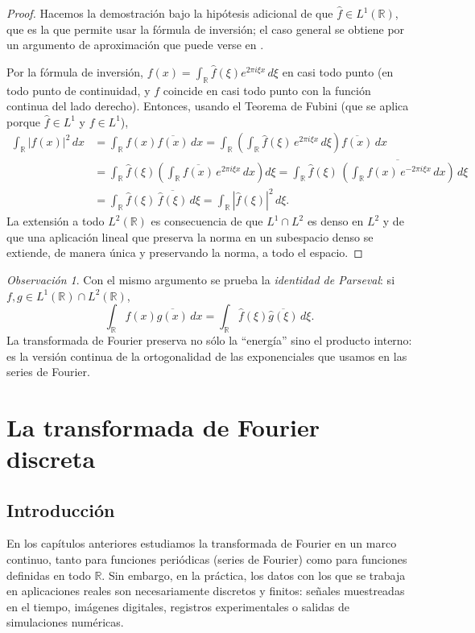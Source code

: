 \documentclass[12pt, a4paper]{amsbook}
\newcommand{\R}{{\mathbb R}}
\theoremstyle{remark}
\newtheorem{obs}[teo]{Observación}
\theoremstyle{definition}
\numberwithin{section}{chapter}
\numberwithin{subsection}{section}
\numberwithin{equation}{section}
\numberwithin{figure}{chapter}
\begin{document}
\begin{proof}
Hacemos la demostración bajo la hipótesis adicional de que $\hat f\in L^1(\R)$, que es la que permite usar la fórmula de inversión; el caso general se obtiene por un argumento de aproximación que puede verse en \cite{Duoandikoetxea}.

Por la fórmula de inversión, $f(x) = \int_\R \hat f(\xi)e^{2\pi i\xi x}\,d\xi$ en casi todo punto (en todo punto de continuidad, y $f$ coincide en casi todo punto con la función continua del lado derecho). Entonces, usando el Teorema de Fubini (que se aplica porque $\hat f\in L^1$ y $f\in L^1$),
\begin{align*}
\int_\R |f(x)|^2\, dx &= \int_\R f(x)\overline{f(x)}\, dx = \int_\R \left(\int_\R \hat f(\xi)\, e^{2\pi i \xi x}\, d\xi\right)\overline{f(x)}\, dx\\
&= \int_\R \hat f(\xi)\left(\int_\R \overline{f(x)}\, e^{2\pi i\xi x}\, dx\right) d\xi
= \int_\R \hat f(\xi)\,\overline{\left(\int_\R f(x)\, e^{-2\pi i\xi x}\, dx\right)}\, d\xi\\
&= \int_\R \hat f(\xi)\,\overline{\hat f(\xi)}\, d\xi = \int_\R |\hat f(\xi)|^2\, d\xi.
\end{align*}
La extensión a todo $L^2(\R)$ es consecuencia de que $L^1\cap L^2$ es denso en $L^2$ y de que una aplicación lineal que preserva la norma en un subespacio denso se extiende, de manera única y preservando la norma, a todo el espacio.
\end{proof}

\begin{obs}
Con el mismo argumento se prueba la \emph{identidad de Parseval}: si $f,g\in L^1(\R)\cap L^2(\R)$,
$$
\int_\R f(x)\overline{g(x)}\, dx = \int_\R \hat f(\xi)\overline{\hat g(\xi)}\, d\xi .
$$
La transformada de Fourier preserva no sólo la ``energía'' sino el producto interno: es la versión continua de la ortogonalidad de las exponenciales que usamos en las series de Fourier.
\end{obs}



\chapter{La transformada de Fourier discreta}\label{chap:DFT}

\section{Introducción}
En los capítulos anteriores estudiamos la transformada de Fourier en un marco continuo, tanto para funciones periódicas (series de Fourier) como para funciones definidas en todo $\R$. Sin embargo, en la práctica, los datos con los que se trabaja en aplicaciones reales son necesariamente discretos y finitos: señales muestreadas en el tiempo, imágenes digitales, registros experimentales o salidas de simulaciones numéricas.
\end{document}
